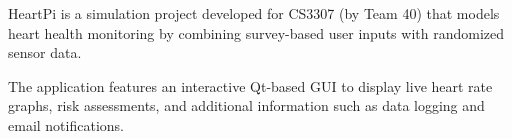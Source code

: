Heart\+Pi is a simulation project developed for CS3307 (by Team 40) that models heart health monitoring by combining survey-\/based user inputs with randomized sensor data.

The application features an interactive Qt-\/based GUI to display live heart rate graphs, risk assessments, and additional information such as data logging and email notifications. 